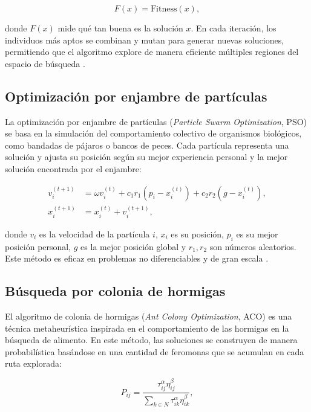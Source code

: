 \begin{itemize}
		\begin{equation}
			F(x) = \text{Fitness}(x),
		\end{equation}
		
		donde \(F(x)\) mide qué tan buena es la solución \(x\). En cada iteración, los individuos más aptos se combinan y mutan para generar nuevas soluciones, permitiendo que el algoritmo explore de manera eficiente múltiples regiones del espacio de búsqueda \cite{holland1992adaptation}.
		
		\subsection{Optimización por enjambre de partículas}
		
		La optimización por enjambre de partículas (\textit{Particle Swarm Optimization}, PSO) se basa en la simulación del comportamiento colectivo de organismos biológicos, como bandadas de pájaros o bancos de peces. Cada partícula representa una solución y ajusta su posición según su mejor experiencia personal y la mejor solución encontrada por el enjambre:
		
		\begin{align}
			v_i^{(t+1)} &= \omega v_i^{(t)} + c_1 r_1 (p_i - x_i^{(t)}) + c_2 r_2 (g - x_i^{(t)}), \\
			x_i^{(t+1)} &= x_i^{(t)} + v_i^{(t+1)},
		\end{align}
		
		donde \(v_i\) es la velocidad de la partícula \(i\), \(x_i\) es su posición, \(p_i\) es su mejor posición personal, \(g\) es la mejor posición global y \(r_1, r_2\) son números aleatorios. Este método es eficaz en problemas no diferenciables y de gran escala \cite{kennedy1995particle}.
		
		\subsection{Búsqueda por colonia de hormigas}
		
		El algoritmo de colonia de hormigas (\textit{Ant Colony Optimization}, ACO) es una técnica metaheurística inspirada en el comportamiento de las hormigas en la búsqueda de alimento. En este método, las soluciones se construyen de manera probabilística basándose en una cantidad de feromonas que se acumulan en cada ruta explorada:
		
		\begin{equation}
			P_{ij} = \frac{\tau_{ij}^\alpha \eta_{ij}^\beta}{\sum_{k \in N} \tau_{ik}^\alpha \eta_{ik}^\beta},
		\end{equation}
		

\end{itemize}
